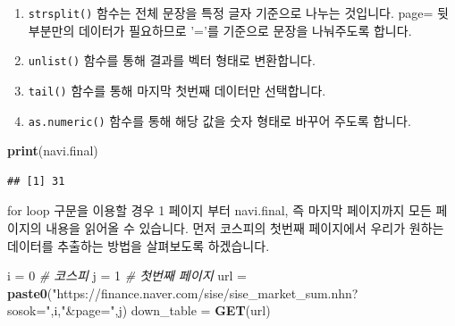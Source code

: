 \documentclass[]{book}
\newenvironment{Shaded}{\begin{snugshade}}{\end{snugshade}}
\newcommand{\CommentTok}[1]{\textcolor[rgb]{0.56,0.35,0.01}{\textit{#1}}}
\newcommand{\DecValTok}[1]{\textcolor[rgb]{0.00,0.00,0.81}{#1}}
\newcommand{\KeywordTok}[1]{\textcolor[rgb]{0.13,0.29,0.53}{\textbf{#1}}}
\newcommand{\NormalTok}[1]{#1}
\newcommand{\OperatorTok}[1]{\textcolor[rgb]{0.81,0.36,0.00}{\textbf{#1}}}
\newcommand{\StringTok}[1]{\textcolor[rgb]{0.31,0.60,0.02}{#1}}
\providecommand{\tightlist}{%
  \setlength{\itemsep}{0pt}\setlength{\parskip}{0pt}}
\begin{document}
\begin{Shaded}
\end{Shaded}

\begin{enumerate}
\def\labelenumi{\arabic{enumi}.}
\tightlist
\item
  \texttt{strsplit()} 함수는 전체 문장을 특정 글자 기준으로 나누는 것입니다. page= 뒷부분만의 데이터가 필요하므로 '='를 기준으로 문장을 나눠주도록 합니다.
\item
  \texttt{unlist()} 함수를 통해 결과를 벡터 형태로 변환합니다.
\item
  \texttt{tail()} 함수를 통해 마지막 첫번째 데이터만 선택합니다.
\item
  \texttt{as.numeric()} 함수를 통해 해당 값을 숫자 형태로 바꾸어 주도록 합니다.
\end{enumerate}

\begin{Shaded}
\begin{Highlighting}[]
\KeywordTok{print}\NormalTok{(navi.final)}
\end{Highlighting}
\end{Shaded}

\begin{verbatim}
## [1] 31
\end{verbatim}

for loop 구문을 이용할 경우 1 페이지 부터 navi.final, 즉 마지막 페이지까지 모든 페이지의 내용을 읽어올 수 있습니다. 먼저 코스피의 첫번째 페이지에서 우리가 원하는 데이터를 추출하는 방법을 살펴보도록 하겠습니다.

\begin{Shaded}
\begin{Highlighting}[]
\NormalTok{i =}\StringTok{ }\DecValTok{0} \CommentTok{# 코스피}
\NormalTok{j =}\StringTok{ }\DecValTok{1} \CommentTok{# 첫번째 페이지}
\NormalTok{url =}\StringTok{ }\KeywordTok{paste0}\NormalTok{(}\StringTok{"https://finance.naver.com/sise/sise_market_sum.nhn?sosok="}\NormalTok{,i,}\StringTok{"&page="}\NormalTok{,j)}
\NormalTok{down_table =}\StringTok{ }\KeywordTok{GET}\NormalTok{(url)}
\end{Highlighting}
\end{Shaded}
\end{document}
